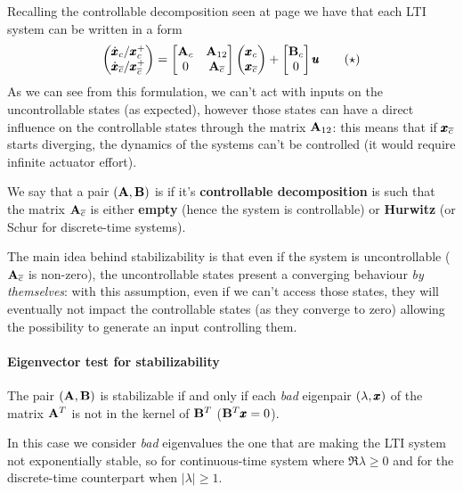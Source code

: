 	Recalling the controllable decomposition seen at page \pageref{eq:gram:controllabledecomposition} we have that each LTI system can be written in a form
	\[ \begin{pmatrix} \dot{\pmb{x}}_c/\pmb{x}^+_c \\ \dot{\pmb{x}}_{\overline c}/\pmb{x}^+_{\overline c} \end{pmatrix} = \begin{bmatrix}  \mathbf{A}_c & \mathbf{A}_{12} \\ 0 & \mathbf{A}_{\overline c}  \end{bmatrix} \begin{pmatrix} \pmb{x}_c \\ \pmb{x}_{\overline c} \end{pmatrix} + \begin{bmatrix} \mathbf{B}_c \\ 0 \end{bmatrix} \pmb{u} \tag{$\star$}\] 	
	As we can see from this formulation, we can't act with inputs on the uncontrollable states (as expected), however those states can have a direct influence on the controllable states through the matrix $\mathbf{A}_{12}$: this means that if $\pmb{x}_{\overline c}$ starts diverging, the dynamics of the systems can't be controlled (it would require infinite actuator effort).
	
	We say that a pair $(\mathbf{A},\mathbf{B})$ is  if it's \textbf{controllable decomposition} is such that the matrix $\mathbf{A}_{\overline c}$ is either \textbf{empty} (hence the system is controllable) or \textbf{Hurwitz} (or Schur for discrete-time systems).
	
	The main idea behind stabilizability is that even if the system is uncontrollable ($\mathbf{A}_{\overline c}$ is non-zero), the uncontrollable states present a converging behaviour \textit{by themselves}: with this assumption, even if we can't access those states, they will eventually not impact the controllable states (as they converge to zero) allowing the possibility to generate an input controlling them.
	
	\paragraph{Eigenvector test for stabilizability} The pair $(\mathbf{A},\mathbf{B})$ is stabilizable if and only if each \textit{bad} eigenpair $(\lambda, \pmb{x})$ of the matrix $\mathbf{A}^T$ is not in the kernel of $\mathbf{B}^T$ ($\mathbf{B}^T\pmb{x} = 0$).
	
	In this case we consider \textit{bad} eigenvalues the one that are making the LTI system not exponentially stable, so for continuous-time system where $\Re\lambda \geq 0$ and for the discrete-time counterpart when $|\lambda|\geq 1$.
	
